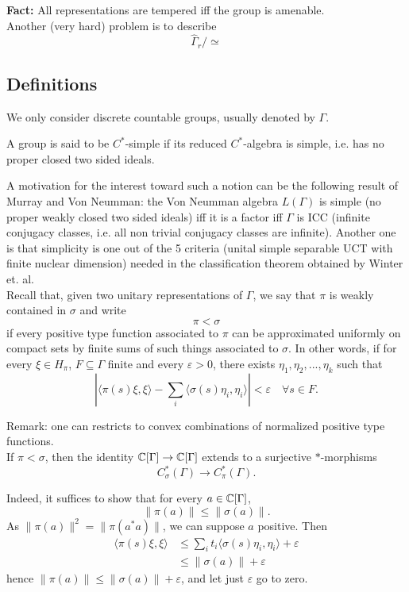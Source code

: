 \textbf{Fact:} All representations are tempered iff the group is amenable.\\

Another (very hard) problem is to describe 
\[\hat \Gamma_r / \simeq\]

\subsection{Definitions}

We only consider discrete countable groups, usually denoted by $\Gamma$.

\begin{definition}
A group is said to be $C^*$-simple if its reduced $C^*$-algebra is simple, i.e. has no proper closed two sided ideals. 
\end{definition}

A motivation for the interest toward such a notion can be the following result of Murray and Von Neumman: the Von Neumman algebra $L(\Gamma)$ is simple (no proper weakly closed two sided ideals) iff it is a factor iff $\Gamma$ is ICC (infinite conjugacy classes, i.e. all non trivial conjugacy classes are infinite). Another one is that simplicity is one out of the 5 criteria (unital simple separable UCT with finite nuclear dimension) needed in the classification theorem obtained by Winter et. al.\\  

Recall that, given two unitary representations of $\Gamma$, we say that $\pi$ is weakly contained in $\sigma$ and write 
\[\pi < \sigma\]
if every positive type function associated to $\pi$ can be approximated uniformly on compact sets by finite sums of such things associated to $\sigma$. In other words, if for every $\xi \in H_\pi$, $F\subseteq \Gamma$ finite and every $\varepsilon >0$, there exists $ \eta_1, \eta_2, ... , \eta_k$ such that
\[ | \langle \pi(s)\xi, \xi\rangle - \sum_i \langle \sigma (s)\eta_i,\eta_i \rangle| < \varepsilon \quad \forall s\in F.\]

Remark: one can restricts to convex combinations of normalized positive type functions.\\ 

If $\pi < \sigma$, then the identity $\mathbb C [\Gamma] \rightarrow \mathbb C [\Gamma]$ extends to a surjective $*$-morphisms
\[C_\sigma^*(\Gamma) \rightarrow C_\pi^*(\Gamma).\]

Indeed, it suffices to show that for every $a\in \mathbb C [\Gamma]$, \[ \| \pi(a)\| \leq \| \sigma(a)\|. \]
As $\| \pi(a)\|^2 = \| \pi(a^*a)\|$, we can suppose $a$ positive. Then
\[\begin{split}
 \langle \pi(s)\xi, \xi\rangle  & \leq   \sum_i t_i \langle \sigma (s)\eta_i,\eta_i \rangle +\varepsilon \\
				& \leq \| \sigma(a)\|+ \varepsilon
\end{split}\]
hence $\| \pi(a)\| \leq \| \sigma(a)\| +\varepsilon$, and let just $\varepsilon $ go to zero.

